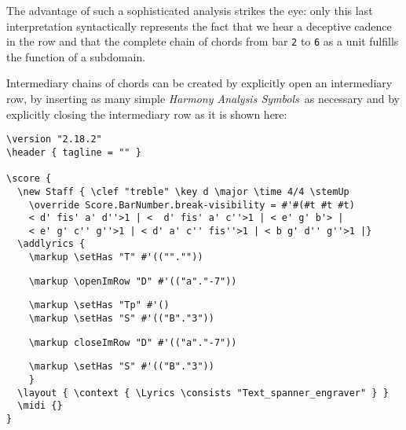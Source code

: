 \documentclass[
  DIV=calc,
  BCOR=5mm,
  12pt,
  headings=small,
  oneside,
  abstract=true,
  toc=bib,
  xcolor=dvipsnames,
  openany,
  english]{scrartcl}
\newcommand{\has}[1]{\textit{Harmony Analysis Symbol#1}}
\begin{document}
\begin{center}
\end{center}

The advantage of such a sophisticated analysis strikes the eye: only this last
interpretation syntactically represents the fact that we hear a deceptive
cadence in the row and that the complete chain of chords from bar \texttt{2} to
\texttt{6} as a unit fulfills the function of a subdomain.

Intermediary chains of chords can be created by explicitly open an intermediary
row, by inserting as many simple \has{s}\ as necessary and by explicitly closing
the intermediary row as it is shown here:
\begin{scriptsize}
\begin{verbatim}
\version "2.18.2"
\header { tagline = "" }

\score {
  \new Staff { \clef "treble" \key d \major \time 4/4 \stemUp
    \override Score.BarNumber.break-visibility = #'#(#t #t #t)
    < d' fis' a' d''>1 | <  d' fis' a' c''>1 | < e' g' b'> |
    < e' g' c'' g''>1 | < d' a' c'' fis''>1 | < b g' d'' g''>1 |}
  \addlyrics {
    \markup \setHas "T" #'(("".""))
\end{verbatim}
{ \color{red} \verb|    \markup \openImRow "D" #'(("a"."-7"))| }
\begin{verbatim}
    \markup \setHas "Tp" #'()
    \markup \setHas "S" #'(("B"."3"))
\end{verbatim}
{ \color{red} \verb|    \markup closeImRow "D" #'(("a"."-7"))| }
\begin{verbatim}
    \markup \setHas "S" #'(("B"."3"))
    }
  \layout { \context { \Lyrics \consists "Text_spanner_engraver" } }
  \midi {}
}

\end{verbatim}
\end{scriptsize}
\end{document}
